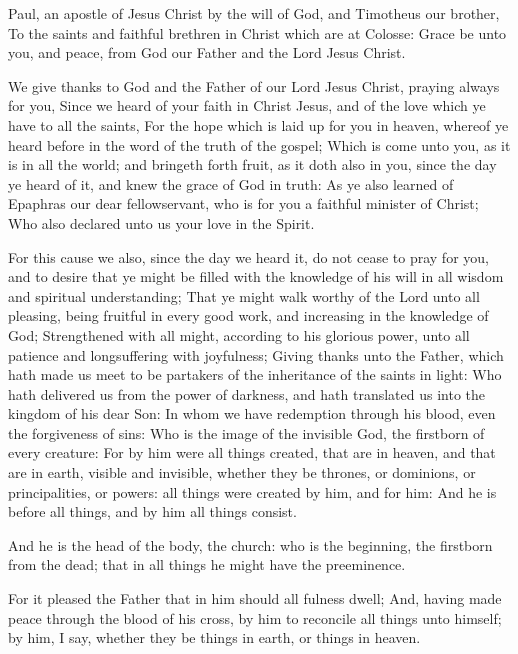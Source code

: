 \Chapter
\Verse Paul, an apostle of Jesus Christ by the will of God, and Timotheus our brother, \Verse To the saints and faithful brethren in Christ which are at Colosse: Grace be unto you, and peace, from God our Father and the Lord Jesus Christ.

\Verse We give thanks to God and the Father of our Lord Jesus Christ, praying always for you, \Verse Since we heard of your faith in Christ Jesus, and of the love which ye have to all the saints, \Verse For the hope which is laid up for you in heaven, whereof ye heard before in the word of the truth of the gospel; \Verse Which is come unto you, as it is in all the world; and bringeth forth fruit, as it doth also in you, since the day ye heard of it, and knew the grace of God in truth: \Verse As ye also learned of Epaphras our dear fellowservant, who is for you a faithful minister of Christ; \Verse Who also declared unto us your love in the Spirit.

\Verse For this cause we also, since the day we heard it, do not cease to pray for you, and to desire that ye might be filled with the knowledge of his will in all wisdom and spiritual understanding; \Verse That ye might walk worthy of the Lord unto all pleasing, being fruitful in every good work, and increasing in the knowledge of God; \Verse Strengthened with all might, according to his glorious power, unto all patience and longsuffering with joyfulness; \Verse Giving thanks unto the Father, which hath made us meet to be partakers of the inheritance of the saints in light: \Verse Who hath delivered us from the power of darkness, and hath translated us into the kingdom of his dear Son: \Verse In whom we have redemption through his blood, even the forgiveness of sins: \Verse Who is the image of the invisible God, the firstborn of every creature: \Verse For by him were all things created, that are in heaven, and that are in earth, visible and invisible, whether they be thrones, or dominions, or principalities, or powers: all things were created by him, and for him: \Verse And he is before all things, and by him all things consist.

\Verse And he is the head of the body, the church: who is the beginning, the firstborn from the dead; that in all things he might have the preeminence.

\Verse For it pleased the Father that in him should all fulness dwell; \Verse And, having made peace through the blood of his cross, by him to reconcile all things unto himself; by him, I say, whether they be things in earth, or things in heaven.

